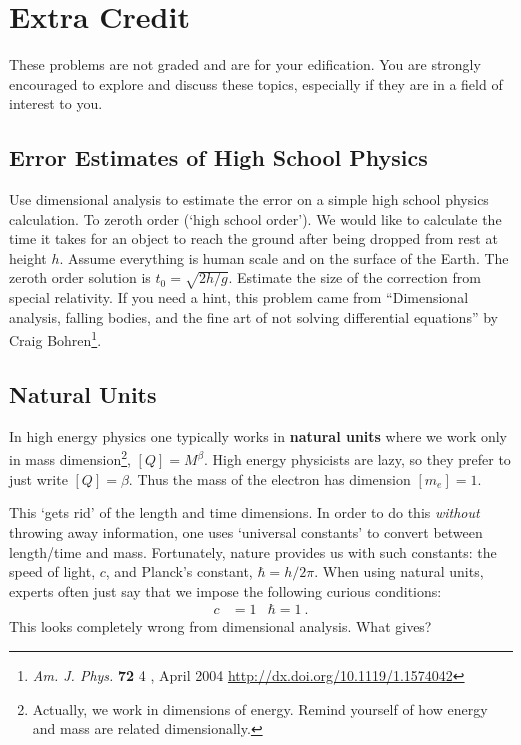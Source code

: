 \documentclass[12pt]{article}
\numberwithin{equation}{subsection}    %
\begin{document}
\section{Extra Credit}

These problems are not graded and are for your edification. You are strongly encouraged to explore and discuss these topics, especially if they are in a field of interest to you.

\subsection{Error Estimates of High School Physics}

Use dimensional analysis to estimate the error on a simple high school physics calculation. To zeroth order (`high school order'). We would like to calculate the time it takes for an object to reach the ground after being dropped from rest at height $h$. Assume everything is human scale and on the surface of the Earth. The zeroth order solution is $t_0 = \sqrt{2h/g}$. Estimate the size of the correction from special relativity. If you need a hint, this problem came from ``Dimensional analysis, falling bodies, and the fine art of not solving differential equations'' by Craig Bohren\footnote{\emph{Am. J. Phys.} \textbf{72}  4 , April 2004 \url{http://dx.doi.org/10.1119/1.1574042}}. 

\subsection{Natural Units}

In high energy physics one typically works in \textbf{natural units} where we work only in mass dimension\footnote{Actually, we work in dimensions of energy. Remind yourself of how energy and mass are related dimensionally.}, $[Q] = M^\beta$. High energy physicists are lazy, so they prefer to just write $[Q]=\beta$. Thus the mass of the electron has dimension $[m_e] = 1$. 

This `gets rid' of the length and time dimensions. In order to do this \emph{without} throwing away information, one uses `universal constants' to convert between length/time and mass. Fortunately, nature provides us with such constants: the speed of light, $c$, and Planck's constant, $\hbar = h/2\pi$. When using natural units, experts often just say that we impose the following curious conditions:
\begin{align}
	c &= 1 
	&
	\hbar = 1 \ .
\end{align}
This looks completely wrong from dimensional analysis. What gives?
\end{document}
